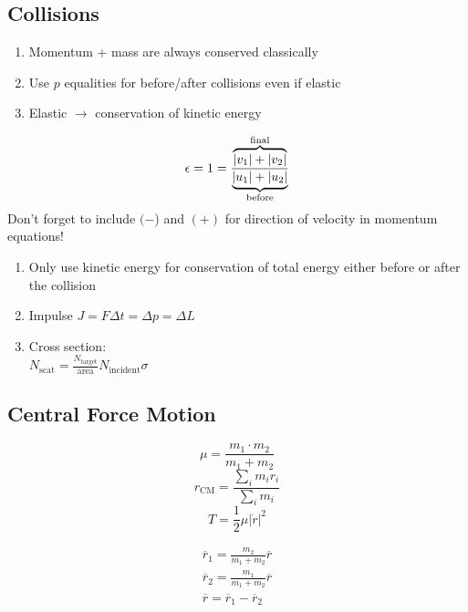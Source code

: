 \documentclass[10pt,letter]{article}
\begin{document}
\subsection{Collisions}
\begin{enumerate}
    \item Momentum + mass are always conserved classically
    \item Use $p$ equalities for before/after collisions even if elastic
    \item Elastic $\rightarrow$ conservation of kinetic energy
\end{enumerate}
\begin{equation}
\epsilon = 1 = \frac{\overbrace{|v_1| + |v_2|}^{\mathclap{\textrm{final}}}}{\underbrace{|u_1| + |u_2|}_{\mathclap{\textrm{before}}}}
\end{equation}
Don't forget to include $(-$) and $(+)$ for direction of velocity in momentum equations!
\begin{enumerate}
    \item Only use kinetic energy for conservation of total energy either before or after the collision
    \item Impulse $J = F \Delta t = \Delta p = \Delta L$
    \item Cross section:\\
    $N_\textrm{scat} = \frac{N_\textrm{target}}{\textrm{area}}N_\textrm{incident} \sigma$
\end{enumerate}

\subsection{Central Force Motion}
\begin{equation}
    \mu = \frac{m_1 \cdot m_2}{m_1 + m_2}
\end{equation}
\begin{equation}
    r_{\textrm{CM}} = \frac{\sum \limits_i m_i r_i}{\sum \limits_i m_i}
\end{equation}
\begin{equation}
 T = \frac{1}{2}\mu |\dot{r}|^2
\end{equation}

\begin{align}
    \overline{r}_1 = \frac{m_2}{m_1 + m_2} \overline{r}\\
    \overline{r}_2 = \frac{m_1}{m_1 + m_2} \overline{r}\\
    \overline{r} = \overline{r}_1 - \overline{r}_2
\end{align}
\end{document}
